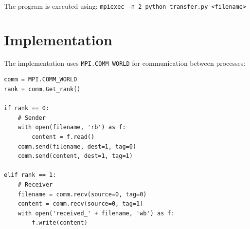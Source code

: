 \documentclass{article}
\begin{document}
The program is executed using: \texttt{mpiexec -n 2 python transfer.py <filename>}

\section{Implementation}
The implementation uses \texttt{MPI.COMM\_WORLD} for communication between processes:
\begin{lstlisting}
comm = MPI.COMM_WORLD
rank = comm.Get_rank()

if rank == 0:
    # Sender
    with open(filename, 'rb') as f:
        content = f.read()
    comm.send(filename, dest=1, tag=0)
    comm.send(content, dest=1, tag=1)
    
elif rank == 1:
    # Receiver
    filename = comm.recv(source=0, tag=0)
    content = comm.recv(source=0, tag=1)
    with open('received_' + filename, 'wb') as f:
        f.write(content)
\end{lstlisting}
\end{document}
